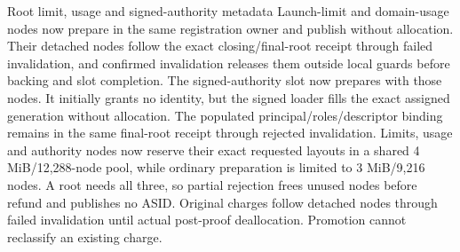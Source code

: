 \begin{implementationdetail}{Root limit, usage and signed-authority metadata}
Launch-limit and domain-usage nodes now prepare in the
same registration owner and publish without allocation. Their detached nodes
follow the exact closing/final-root receipt through failed invalidation, and confirmed
invalidation releases them outside local guards before backing and slot completion.
The signed-authority slot now prepares with those nodes. It initially grants no
identity, but the signed loader fills the exact assigned generation without allocation.
The populated principal/roles/descriptor binding remains in the same final-root
receipt through rejected invalidation. Limits, usage and authority nodes now
reserve their exact requested layouts in a shared 4 MiB/12,288-node pool, while
ordinary preparation is limited to 3 MiB/9,216 nodes. A root needs all three, so
partial rejection frees unused nodes before refund and publishes no ASID.
Original charges follow detached nodes through failed invalidation until actual
post-proof deallocation. Promotion cannot reclassify an existing charge.
\end{implementationdetail}


